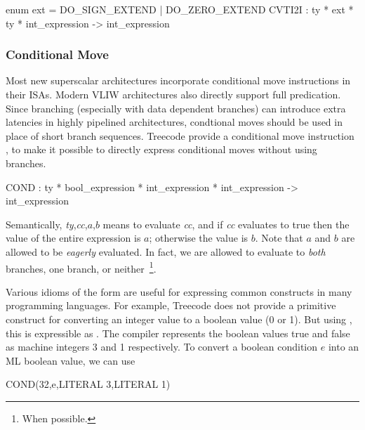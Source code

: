 \begin{SML}
    enum ext = DO_SIGN_EXTEND | DO_ZERO_EXTEND
    CVTI2I : ty * ext * ty * int_expression -> int_expression 
\end{SML}

\subsubsection{Conditional Move} \label{sec:cond-move}
Most new superscalar architectures incorporate conditional move 
instructions in their ISAs.  
Modern VLIW architectures also directly support full predication.  
Since branching (especially with data dependent branches) can
introduce extra latencies in highly pipelined architectures,
condtional moves should be used in place of short branch sequences. 
Treecode provide a conditional move instruction ,
to make it possible to directly express conditional moves without using
branches. 
\begin{SML}
   COND : ty * bool_expression * int_expression * int_expression -> int_expression
\end{SML}

Semantically, \emph{ty},\emph{cc},$a$,$b$\sml{)} means to evaluate
\emph{cc}, and if \emph{cc} evaluates to true then the value of the entire expression is
$a$; otherwise the value is $b$.  Note that $a$ and $b$ are allowed to be
\emph{eagerly}
evaluated.  In fact, we are allowed to evaluate to \emph{both}
branches, one branch, or neither~\footnote{When possible.}. 

Various idioms of the  form are useful for expressing common
constructs in many programming languages.  For example, Treecode does not
provide a primitive construct for converting an integer value  to a
boolean value (0 or 1).  But using , this is expressible as
.  The compiler represents
the boolean values true and false as machine integers 3 and 1 respectively.
To convert a boolean condition $e$ into an ML boolean value, we can use
\begin{SML}
   COND(32,e,LITERAL 3,LITERAL 1)
\end{SML}

